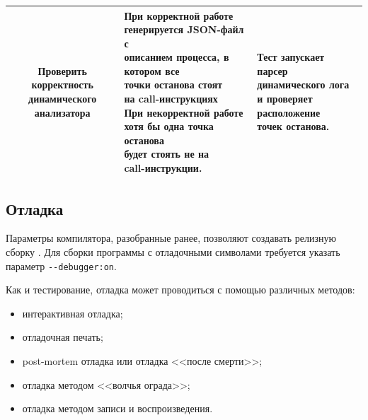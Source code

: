 \begin{table}
{\begin{longtable}{|c|l|l|}
                \makecell{Проверить корректность \\
                    динамического анализатора} & 
                \makecell[l]{
                    При корректной работе\\
                    генерируется JSON-файл с\\
                    описанием процесса, в котором все\\
                    точки останова стоят\\
                    на call-инструкциях
                    \\
                    При некорректной работе\\
                    хотя бы одна точка останова\\
                    будет стоять не на \\
                    call-инструкции.} & 
                \makecell[l]{Тест запускает парсер\\
                    динамического лога \\
                    и проверяет расположение\\
                    точек останова.}\\
                \hline
        \end{longtable}
    }
\end{table}

\subsection{Отладка {\ProgModule}}\label{sec:ch3/sec1/sub3}
Параметры компилятора, разобранные ранее, 
позволяют создавать релизную сборку {\ProgModule}.
Для сборки программы с отладочными символами требуется 
указать параметр \verb|--debugger:on|.

Как и тестирование, отладка может проводиться с помощью
различных методов:
\begin{itemize}
    \item интерактивная отладка;
    \item отладочная печать;
    \item post-mortem отладка или отладка <<после смерти>>;
    \item отладка методом <<волчья ограда>>;
    \item отладка методом записи и воспроизведения.
\end{itemize}

